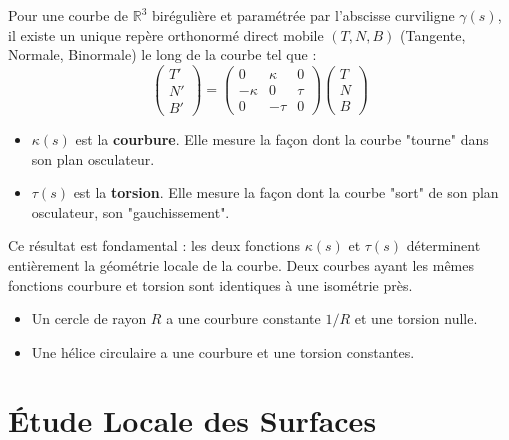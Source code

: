 \begin{theorem}
    Pour une courbe de $\mathbb{R}^3$ birégulière et paramétrée par l'abscisse curviligne $\gamma(s)$, il existe un unique repère orthonormé direct mobile $(T,N,B)$ (Tangente, Normale, Binormale) le long de la courbe tel que :
    $$
    \begin{pmatrix} T' \\ N' \\ B' \end{pmatrix} =
    \begin{pmatrix} 0 & \kappa & 0 \\ -\kappa & 0 & \tau \\ 0 & -\tau & 0 \end{pmatrix}
    \begin{pmatrix} T \\ N \\ B \end{pmatrix}
    $$
    \begin{itemize}
        \item $\kappa(s)$ est la \textbf{courbure}. Elle mesure la façon dont la courbe "tourne" dans son plan osculateur.
        \item $\tau(s)$ est la \textbf{torsion}. Elle mesure la façon dont la courbe "sort" de son plan osculateur, son "gauchissement".
    \end{itemize}
\end{theorem}
\begin{remark}
    Ce résultat est fondamental : les deux fonctions $\kappa(s)$ et $\tau(s)$ déterminent entièrement la géométrie locale de la courbe. Deux courbes ayant les mêmes fonctions courbure et torsion sont identiques à une isométrie près.
\end{remark}
\begin{example}
    \begin{itemize}
        \item Un cercle de rayon $R$ a une courbure constante $1/R$ et une torsion nulle.
        \item Une hélice circulaire a une courbure et une torsion constantes.
    \end{itemize}
\end{example}

\section{Étude Locale des Surfaces}

